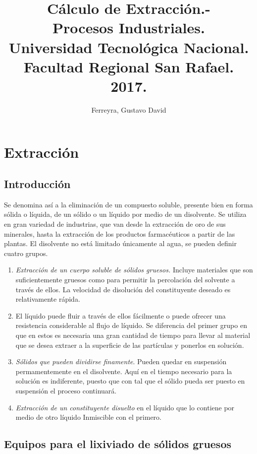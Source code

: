 \documentclass[12pt]{article}
\title{Cálculo de Extracción.-\\ Procesos Industriales.\\ Universidad Tecnológica Nacional.\\ Facultad Regional San Rafael.\\ 2017.}
\author{Ferreyra, Gustavo David}
\date{}
\begin{document}
\maketitle
\newpage

\section{Extracción}
\subsection{Introducción}

Se denomina así a la eliminación de un compuesto soluble, presente bien en forma sólida o líquida,
 de un sólido o un líquido por medio de un disolvente. Se utiliza en gran variedad de industrias,
 que van desde la extracción de oro de sus minerales, hasta la extracción de los productos 
 farmacéuticos a partir de las plantas. El disolvente no está limitado únicamente al agua, se pueden definir
 cuatro grupos.
 \begin{enumerate}
    \item \textit{Extracción de un cuerpo soluble de sólidos gruesos.} Incluye materiales que son
    suficientemente gruesos como para permitir la percolación del solvente a través de ellos. La velocidad de 
    disolución del constituyente deseado es relativamente rápida.
    \item {}El líquido puede fluir a través de ellos
    fácilmente o puede ofrecer una resistencia considerable al flujo de
    líquido. Se diferencia del primer grupo en que en estos es necesaria una gran cantidad de 
    tiempo para llevar al material que se desea extraer a la superficie de las
    partículas y ponerlos en solución.
    \item \textit{Sólidos que pueden dividirse finamente}. Pueden quedar en suspensión
    permamentemente en el disolvente. Aquí en el tiempo necesario
    para la solución es indiferente, puesto que con tal que el sólido
    pueda ser puesto en suspensión el proceso continuará.
    \item \textit{Extracción de un constituyente disuelto} en el líquido que lo contiene por medio
    de otro líquido Inmiscible con el primero. 
\end{enumerate}
\subsection{Equipos para el lixiviado de sólidos gruesos}
\end{document}

